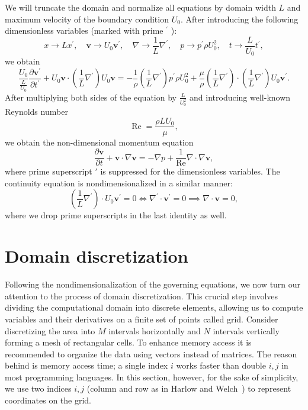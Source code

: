 \documentclass{article}
\numberwithin{equation}{section}
\begin{document}
We will truncate the domain and normalize all equations by domain width $L$ and maximum velocity of the boundary condition $U_0$. After introducing the following dimensionless variables (marked with prime ${ }^{\prime}$ ):
\begin{equation*}
	x\to Lx^{\prime},  \quad 
	\boldsymbol{v}\to U_0\boldsymbol{v}^{\prime}, \quad 
	\nabla\to \frac{1}{L}\nabla^{\prime}, \quad 
	p\to p^{\prime} \rho U_0^2, \quad 
	t\to \frac{L}{U_0}t^{\prime},
\end{equation*}
we obtain
\begin{equation*}
	\frac{U_0}{\frac{L}{U_0}} \frac{\partial \boldsymbol{v}^{\prime}}{\partial t^{\prime}}+U_0\boldsymbol{v}\cdot\left(\frac{1}{L} \nabla^{\prime}\right) U_0\boldsymbol{v}=-\frac{1}{\rho}\left(\frac{1}{L} \nabla^{\prime}\right){p^{\prime}\rho U^2_0}+\frac{\mu}{\rho} \left(\frac{1}{L} \nabla^{\prime}\right) \cdot\left(\frac{1}{L} \nabla^{\prime}\right) U_0\boldsymbol{v}^{\prime}.
\end{equation*}
After multiplying both sides of the equation by $\frac{L}{U_0^2}$ and introducing well-known Reynolds number 
\begin{equation*}
\operatorname{Re}=\frac{\rho L U_0}{\mu},
\end{equation*}
we obtain the non-dimensional momentum equation
\begin{equation*}
	\frac{\partial \boldsymbol{v}}{\partial t} + \boldsymbol{v} \cdot \nabla \boldsymbol{v} = -\nabla p + \frac{1}{\operatorname{Re}} \nabla \cdot \nabla \boldsymbol{v},
\end{equation*}
where prime superscript $\prime$ is suppressed for the dimensionless variables. The continuity equation is nondimensionalized in a similar manner:
\begin{equation*}
	\left(\frac{1}{L} \nabla^{\prime}\right) \cdot U_0\boldsymbol{v}^{\prime}=0\iff\nabla^{\prime} \cdot\boldsymbol{v}^{\prime}=0\implies\nabla \cdot\boldsymbol{v}=0,
\end{equation*}
where we drop prime superscripts in the last identity as well.



\section{Domain discretization}\label{sec:domain-discretization}
Following the nondimensionalization of the governing equations, we now turn our attention to the process of domain discretization. This crucial step involves dividing the computational domain into discrete elements, allowing us to compute variables and their derivatives on a finite set of points called grid. Consider discretizing the area into $M$ intervals horizontally and $N$ intervals vertically forming a mesh of rectangular cells. To enhance memory access it is recommended to organize the data using vectors instead of matrices. 
The reason behind is memory access time; a single index $i$ works faster than double $i,j$ in most programming languages. In this section, however, for the sake of simplicity, we use two indices $i,j$ (column and row as in Harlow and Welch~\cite{Harlow:1965}) to represent coordinates on the grid.
\end{document}

